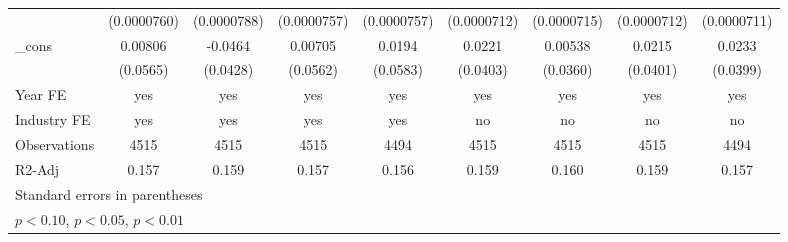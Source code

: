\begin{table}[htbp]
\begin{tabular}{l*{8}{c}}
                    & (0.0000760)         & (0.0000788)         & (0.0000757)         & (0.0000757)         & (0.0000712)         & (0.0000715)         & (0.0000712)         & (0.0000711)         \\
\_cons              &     0.00806         &     -0.0464         &     0.00705         &      0.0194         &      0.0221         &     0.00538         &      0.0215         &      0.0233         \\
                    &    (0.0565)         &    (0.0428)         &    (0.0562)         &    (0.0583)         &    (0.0403)         &    (0.0360)         &    (0.0401)         &    (0.0399)         \\
\hline
Year FE             &         yes         &         yes         &         yes         &         yes         &         yes         &         yes         &         yes         &         yes         \\
Industry FE         &         yes         &         yes         &         yes         &         yes         &          no         &          no         &          no         &          no         \\
Observations        &        4515         &        4515         &        4515         &        4494         &        4515         &        4515         &        4515         &        4494         \\
R2-Adj              &       0.157         &       0.159         &       0.157         &       0.156         &       0.159         &       0.160         &       0.159         &       0.157         \\
\hline\hline
\multicolumn{9}{l}{\footnotesize Standard errors in parentheses}\\
\multicolumn{9}{l}{\footnotesize \sym{*} \(p<0.10\), \sym{**} \(p<0.05\), \sym{***} \(p<0.01\)}\\
\end{tabular}
\end{table}
